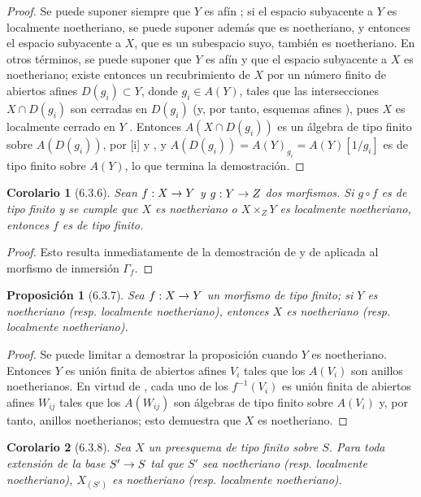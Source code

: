 \documentclass[oneside]{amsart}
\theoremstyle{ega-env-style}
\theoremstyle{ega-thm-env-style}
\newtheorem*{proposition}{Proposición}
\newtheorem*{corollary}{Corolario}
\theoremstyle{ega-defn-env-style}
\renewcommand{\to}{\mathchoice{\longrightarrow}{\rightarrow}{\rightarrow}{\rightarrow}}
\let\EGAOriginalLabel\label
\renewcommand{\label}[1]{\phantomsection\EGAOriginalLabel{#1}}
\begin{document}
\begin{proof}
Se puede suponer siempre que $Y$ es afín ;
si el espacio subyacente a $Y$ es localmente noetheriano, se puede suponer además que es noetheriano, y entonces el espacio subyacente a $X$, que es un subespacio suyo, también es noetheriano.
En otros términos, se puede suponer que $Y$ es afín y que el espacio subyacente a $X$ es noetheriano;
existe entonces un recubrimiento de $X$ por un número finito de abiertos afines $D(g_i)\subset Y$, donde $g_i\in A(Y)$, tales que las intersecciones $X\cap D(g_i)$ son cerradas en $D(g_i)$ (y, por tanto, esquemas afines ), pues $X$ es localmente cerrado en $Y$ .
Entonces $A(X\cap D(g_i))$ es un álgebra de tipo finito sobre $A(D(g_i))$, por [i] y , y $A(D(g_i))=A(Y)_{g_i}=A(Y)[1/g_i]$ es de tipo finito sobre $A(Y)$, lo que termina la demostración.
\end{proof}

\begin{corollary}[6.3.6]
\label{I.6.3.6}
Sean $f:X\to Y$ y $g:Y\to Z$ dos morfismos.
Si $g\circ f$ es de tipo finito y se cumple que $X$ es noetheriano o $X\times_Z Y$ es localmente noetheriano, entonces $f$ es de tipo finito.
\end{corollary}

\begin{proof}
Esto resulta inmediatamente de la demostración de  y de  aplicada al morfismo de inmersión $\Gamma_f$.
\end{proof}

\begin{proposition}[6.3.7]
\label{I.6.3.7}
Sea $f:X\to Y$ un morfismo de tipo finito;
si $Y$ es noetheriano \textup{(resp.} localmente noetheriano), entonces $X$ es noetheriano \textup{(resp.} localmente noetheriano).
\end{proposition}

\begin{proof}
Se puede limitar a demostrar la proposición cuando $Y$ es noetheriano.
Entonces $Y$ es unión finita de abiertos afines $V_i$ tales que los $A(V_i)$ son anillos noetherianos.
En virtud de , cada uno de los $f^{-1}(V_i)$ es unión finita de abiertos afines $W_{ij}$ tales que los $A(W_{ij})$ son álgebras de tipo finito sobre $A(V_i)$ y, por tanto, anillos noetherianos;
esto demuestra que $X$ es noetheriano.
\end{proof}

\begin{corollary}[6.3.8]
\label{I.6.3.8}
Sea $X$ un preesquema de tipo finito sobre $S$.
Para toda extensión de la base $S'\to S$ tal que $S'$ sea noetheriano \textup{(resp.} localmente noetheriano), $X_{(S')}$ es noetheriano \textup{(resp.} localmente noetheriano).
\end{corollary}
\end{document}
